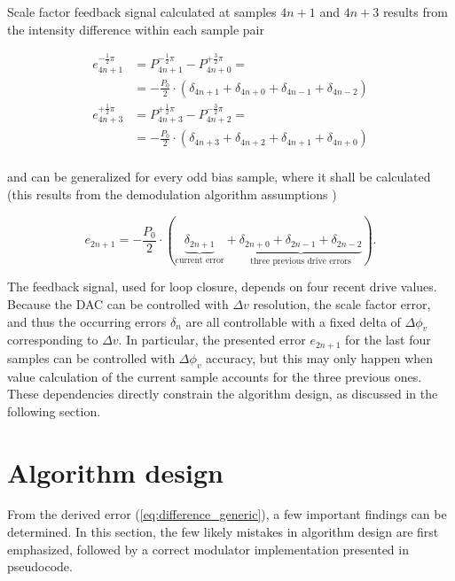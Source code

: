 \documentclass[journal,twoside,web]{ieeecolor}
\begin{document}
\noindent
Scale factor feedback signal calculated at samples $4n+1$ and $4n+3$ results from the intensity difference within each sample pair

\begin{equation}
    \begin{split}
        e_{4n+1}^{-\frac{1}{2}\pi} & = P_{4n+1}^{-\frac{1}{2}\pi} - P_{4n+0}^{+\frac{3}{2}\pi} =                            \\ 
                                   & = -\frac{P_0}{2} \cdot (\delta_{4n+1} + \delta_{4n+0} + \delta_{4n-1} + \delta_{4n-2}) \\
        e_{4n+3}^{+\frac{1}{2}\pi} & = P_{4n+3}^{+\frac{1}{2}\pi} - P_{4n+2}^{-\frac{3}{2}\pi}  =                           \\
                                   & = -\frac{P_0}{2} \cdot (\delta_{4n+3} + \delta_{4n+2} + \delta_{4n+1} + \delta_{4n+0}) \\
    \end{split}
    \label{eq:difference}
\end{equation}

\noindent
and can be generalized for every odd bias sample, where it shall be calculated (this results from the demodulation algorithm assumptions \cite{lefevre1993fiber})

\begin{equation}
    e_{2n+1} = -\frac{P_0}{2} \cdot (\underbrace{\delta_{2n+1}}_{\text{current error}} + \underbrace{\delta_{2n+0} + \delta_{2n-1} + \delta_{2n-2}}_{\text{three previous drive errors}}) \text{.}
    \label{eq:difference_generic}
\end{equation}

\noindent
The feedback signal, used for loop closure, depends on four recent drive values. Because the DAC can be controlled with $\Delta{}v$ resolution, the scale factor error, and thus the occurring errors $\delta_n$ are all controllable with a fixed delta of $\Delta\phi_{v}$ corresponding to $\Delta{}v$. In particular, the presented error $e_{2n+1}$ for the last four samples can be controlled with $\Delta\phi_{v}$ accuracy, but this may only happen when value calculation of the current sample accounts for the three previous ones. These dependencies directly constrain the algorithm design, as discussed in the following section.

\section{Algorithm design}
From the derived error (\ref{eq:difference_generic}), a few important findings can be determined. In this section, the few likely mistakes in algorithm design are first emphasized, followed by a correct modulator implementation presented in pseudocode.
\end{document}
